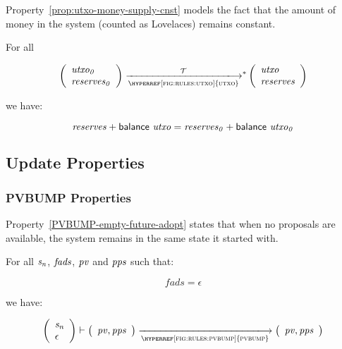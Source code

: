 Property~\ref{prop:utxo-money-supply-cnst} models the fact that the amount of
money in the system (counted as Lovelaces) remains constant.

\begin{property}\label{prop:utxo-money-supply-cnst}
  For all

  $$
  \left(
    \begin{array}{l}
      \var{utxo_0}\\
      \var{reserves_0}
    \end{array}
  \right)
  \transtar{\hyperref[fig:rules:utxo]{utxo}}{\txs}
  \left(
    \begin{array}{l}
      \var{utxo}\\
      \var{reserves}
    \end{array}
  \right)
  $$

  we have:

  $$ \mathit{reserves} + \mathsf{balance}~ \mathit{utxo} =  \mathit{reserves_0} + \mathsf{balance}~ \mathit{utxo_0} $$
\end{property}

\subsection{Update Properties}
\label{sec:update-properties}

\subsubsection{PVBUMP Properties}
\label{sec:pvbump-properties}

Property~\ref{PVBUMP-empty-future-adopt} states that when no proposals are
available, the system remains in the same state it started with.

\begin{property}\label{PVBUMP-empty-future-adopt}
  For all $\mathit{s_n}$, $\mathit{fads}$, $\mathit{pv}$ and $\mathit{pps}$ such
  that:

  $$fads = \epsilon$$

  we have:

  $$
  \left(
    \begin{array}{l}
      \var{s_n}\\
      \epsilon
    \end{array}
  \right)
  \vdash
  \left(
    \begin{array}{l}
      \var{pv}, \var{pps}\\
    \end{array}
  \right)
  \trans{\hyperref[fig:rules:pvbump]{pvbump}}{}
  \left(
    \begin{array}{l}
      \var{pv}, \var{pps}\\
    \end{array}
  \right)
  $$
\end{property}

